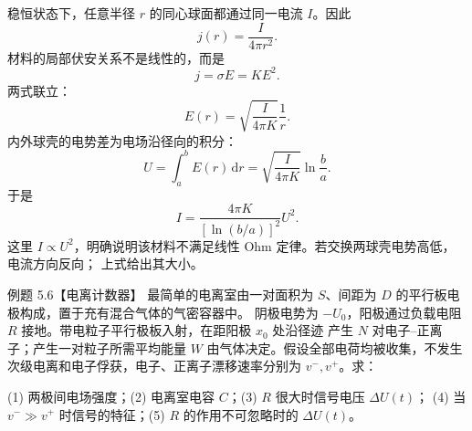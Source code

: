 \conductingShellFigure
{}

\begin{xesolution}
稳恒状态下，任意半径 $r$ 的同心球面都通过同一电流 $I$。因此
\[
  j(r)=\frac{I}{4\pi r^2}.
\]
材料的局部伏安关系不是线性的，而是
\[
  j=\sigma E=KE^2.
\]
两式联立：
\[
  E(r)=\sqrt{\frac{I}{4\pi K}}\frac1r.
\]
内外球壳的电势差为电场沿径向的积分：
\[
  U=\int_a^bE(r)\,\mathrm dr
  =\sqrt{\frac{I}{4\pi K}}\ln\frac ba.
\]
于是
\[
  \boxed{I=\frac{4\pi K}{[\ln(b/a)]^2}U^2}.
\]
这里 $I\propto U^2$，明确说明该材料不满足线性 Ohm 定律。若交换两球壳电势高低，电流方向反向；
上式给出其大小。
\end{xesolution}

\begin{origexamplebox}{例题 5.6【电离计数器】}
最简单的电离室由一对面积为 $S$、间距为 $D$ 的平行板电极构成，置于充有混合气体的气密容器中。
阴极电势为 $-U_0$，阳极通过负载电阻 $R$ 接地。带电粒子平行极板入射，在距阳极 $x_0$ 处沿径迹
产生 $N$ 对电子--正离子；产生一对粒子所需平均能量 $W$ 由气体决定。假设全部电荷均被收集，不发生
次级电离和电子俘获，电子、正离子漂移速率分别为 $v^-,v^+$。求：

(1) 两极间电场强度；(2) 电离室电容 $C$；(3) $R$ 很大时信号电压 $\Delta U(t)$；
(4) 当 $v^-\gg v^+$ 时信号的特征；(5) $R$ 的作用不可忽略时的 $\Delta U(t)$。
\emIonChamberQuestion
{}\label{fig:em-source-thirty-sixth-section-6}
\end{origexamplebox}

\ionChamberFigure
{}

